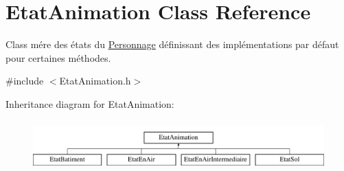 \hypertarget{classEtatAnimation}{\section{Etat\-Animation Class Reference}
\label{classEtatAnimation}
}


Class mére des états du \hyperlink{classPersonnage}{Personnage} définissant des implémentations par défaut pour certaines méthodes.  




{\ttfamily \#include $<$Etat\-Animation.\-h$>$}

Inheritance diagram for Etat\-Animation\-:\begin{figure}[H]
\begin{center}
\leavevmode
\includegraphics[height=1.917808cm]{classEtatAnimation}
\end{center}
\end{figure}
